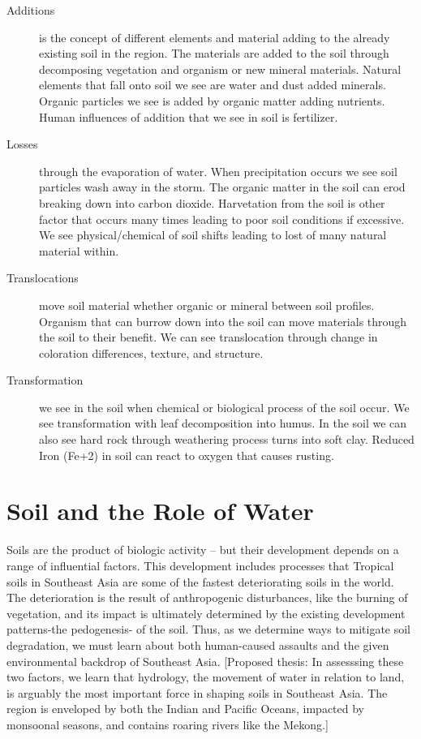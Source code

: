 \begin{description}
	\item[Additions] is the concept of different elements and material adding to the already existing soil in the region. The materials are added to the soil through decomposing vegetation and organism or new mineral materials.  Natural elements that fall onto soil we see are water and dust added minerals. Organic particles we see is added by organic matter adding nutrients. Human influences of addition that we see in soil is fertilizer. 

\item[Losses] through the evaporation of water. When precipitation occurs we see soil particles wash away in the storm. The organic matter in the soil can erod breaking down into carbon dioxide.  Harvetation from the soil is other factor that occurs many times leading to poor soil conditions if excessive. We see physical/chemical of soil shifts leading to lost of many natural material within. 

\item[Translocations] move soil material whether organic or mineral between soil profiles. Organism that can burrow down into the soil can move materials through the soil to their benefit. We can see translocation through change in coloration differences, texture, and structure.

\item[Transformation] we see in the soil when chemical or biological process of the soil occur. We see transformation with leaf decomposition into humus. In the soil we can also see hard rock through weathering process turns into soft clay. Reduced Iron (Fe+2) in soil can react to oxygen that causes rusting.

\end{description}


\section{Soil and the Role of Water}

Soils are the product of biologic activity -- but their development depends on a range of influential factors. This development includes processes that 
Tropical soils in Southeast Asia are some of the fastest deteriorating soils in the world. The deterioration is the result of anthropogenic disturbances, like the burning of vegetation, and its impact is ultimately determined by the existing development patterns-the pedogenesis- of the soil. Thus, as we determine ways to mitigate soil degradation, we must learn about both human-caused assaults and the given environmental backdrop of Southeast Asia. [Proposed thesis: In assesssing these two factors, we learn that hydrology, the movement of water in relation to land, is arguably the most important force in shaping soils in Southeast Asia. The region is enveloped by both the Indian and Pacific Oceans, impacted by monsoonal seasons, and contains roaring rivers like the Mekong.] 

